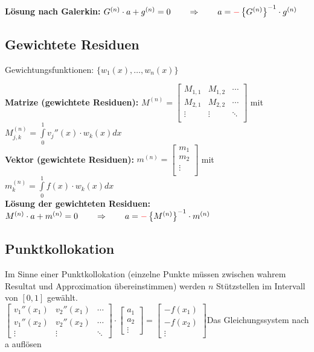 \textbf{Lösung nach Galerkin:} $G^{(n)}\cdot a+g^{(n)}=0\qquad \Rightarrow \qquad a=\textcolor{red}{\mathbf{-}}\left\{G^{(n)}\right\}^{-1}\cdot g^{(n)}$


\subsection{Gewichtete Residuen}

Gewichtungsfunktionen: $\{w_1(x),\ldots,w_n(x)\}$

\textbf{Matrize (gewichtete Residuen): }
$M^{(n)}=\begin{bmatrix}
	M_{1,1}& M_{1,2}&\cdots\\
	M_{2,1}& M_{2,2}&\cdots\\
	\vdots & \vdots &\ddots\\
\end{bmatrix}$ \qquad mit \qquad $M_{j,k}^{(n)}=\int\limits_{0}^{1}{v_j''(x)\cdot w_k(x) dx}$\\
\textbf{Vektor (gewichtete Residuen): } 
$m^{(n)}=\begin{bmatrix}
	m_1\\
	m_2\\
	\vdots\\
\end{bmatrix}$ \qquad mit \qquad $m_{k}^{(n)}=\int\limits_{0}^{1}{f(x)\cdot w_k(x) dx}$\\

\textbf{Lösung der gewichteten Residuen:} $M^{(n)}\cdot a+m^{(n)}=0\qquad \Rightarrow \qquad a=\textcolor{red}{\mathbf{-}}\left\{M^{(n)}\right\}^{-1}\cdot m^{(n)}$

\subsection{Punktkollokation}
Im Sinne einer Punktkollokation (einzelne Punkte müssen zwischen wahrem Resultat und Approximation übereinstimmen) werden $n$ Stützstellen im Intervall von $[0,1]$ gewählt.\\

$\begin{bmatrix}
	v_1''(x_1)& v_2''(x_1)&\cdots\\
	v_1''(x_2)& v_2''(x_2)&\cdots\\
	\vdots& \vdots&\ddots
\end{bmatrix}\cdot
\begin{bmatrix}
a_1\\
a_2\\
\vdots
\end{bmatrix}
=\begin{bmatrix}
-f(x_1)\\
-f(x_2)\\
\vdots
\end{bmatrix}$\qquad Das Gleichungssystem nach a auflösen\\

